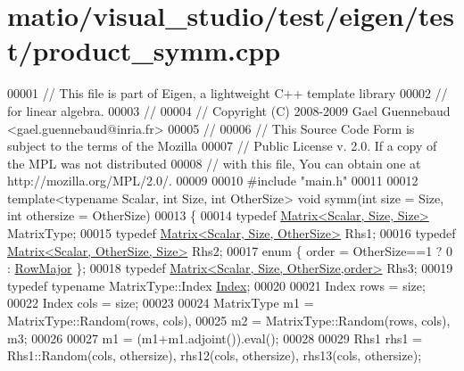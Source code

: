 \hypertarget{matio_2visual__studio_2test_2eigen_2test_2product__symm_8cpp_source}{}\section{matio/visual\+\_\+studio/test/eigen/test/product\+\_\+symm.cpp}
\label{matio_2visual__studio_2test_2eigen_2test_2product__symm_8cpp_source}

\begin{DoxyCode}
00001 \textcolor{comment}{// This file is part of Eigen, a lightweight C++ template library}
00002 \textcolor{comment}{// for linear algebra.}
00003 \textcolor{comment}{//}
00004 \textcolor{comment}{// Copyright (C) 2008-2009 Gael Guennebaud <gael.guennebaud@inria.fr>}
00005 \textcolor{comment}{//}
00006 \textcolor{comment}{// This Source Code Form is subject to the terms of the Mozilla}
00007 \textcolor{comment}{// Public License v. 2.0. If a copy of the MPL was not distributed}
00008 \textcolor{comment}{// with this file, You can obtain one at http://mozilla.org/MPL/2.0/.}
00009 
00010 \textcolor{preprocessor}{#include "main.h"}
00011 
00012 \textcolor{keyword}{template}<\textcolor{keyword}{typename} Scalar, \textcolor{keywordtype}{int} Size, \textcolor{keywordtype}{int} OtherSize> \textcolor{keywordtype}{void} symm(\textcolor{keywordtype}{int} size = Size, \textcolor{keywordtype}{int} othersize = OtherSize)
00013 \{
00014   \textcolor{keyword}{typedef} \hyperlink{group___core___module_class_eigen_1_1_matrix}{Matrix<Scalar, Size, Size>} MatrixType;
00015   \textcolor{keyword}{typedef} \hyperlink{group___core___module_class_eigen_1_1_matrix}{Matrix<Scalar, Size, OtherSize>} Rhs1;
00016   \textcolor{keyword}{typedef} \hyperlink{group___core___module_class_eigen_1_1_matrix}{Matrix<Scalar, OtherSize, Size>} Rhs2;
00017   \textcolor{keyword}{enum} \{ order = OtherSize==1 ? 0 : \hyperlink{group__enums_ggaacded1a18ae58b0f554751f6cdf9eb13acfcde9cd8677c5f7caf6bd603666aae3}{RowMajor} \};
00018   \textcolor{keyword}{typedef} \hyperlink{group___core___module_class_eigen_1_1_matrix}{Matrix<Scalar, Size, OtherSize,order>} Rhs3;
00019   \textcolor{keyword}{typedef} \textcolor{keyword}{typename} MatrixType::Index \hyperlink{namespace_eigen_a62e77e0933482dafde8fe197d9a2cfde}{Index};
00020 
00021   Index rows = size;
00022   Index cols = size;
00023 
00024   MatrixType m1 = MatrixType::Random(rows, cols),
00025              m2 = MatrixType::Random(rows, cols), m3;
00026 
00027   m1 = (m1+m1.adjoint()).eval();
00028 
00029   Rhs1 rhs1 = Rhs1::Random(cols, othersize), rhs12(cols, othersize), rhs13(cols, othersize);

\end{DoxyCode}

